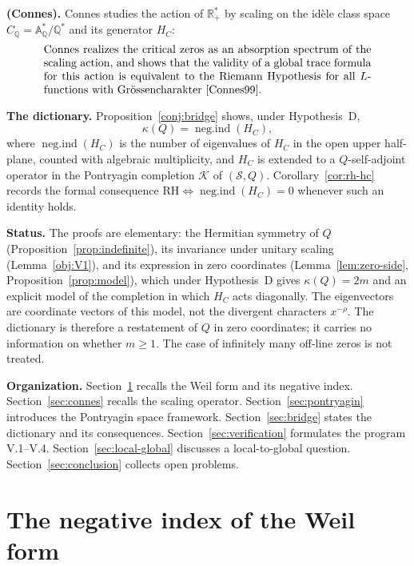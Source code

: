 \documentclass[11pt]{amsart}
\newcommand{\kap}{\kappa}
\newcommand{\negind}{\operatorname{neg.ind}}
\newcommand{\AQ}{\mathbb{A}_{\mathbb{Q}}}
\newcommand{\CQ}{C_{\mathbb{Q}}}
\newcommand{\Kcal}{\mathcal{K}}
\newcommand{\Scal}{\mathcal{S}}
\newcommand{\Rp}{\mathbb{R}^*_+}
\begin{document}
\medskip
\textbf{(Connes).}  Connes \cite{Connes99} studies the action of $\Rp$ by scaling on the
id\`ele class space $\CQ = \AQ^*/\mathbb{Q}^*$ and its generator $H_C$:
\begin{equation}\label{eq:connes-RH}
\begin{minipage}{0.85\textwidth}
Connes realizes the critical zeros as an absorption spectrum of the scaling action, and shows
that the validity of a global trace formula for this action is equivalent to the Riemann
Hypothesis for all $L$-functions with Gr\"ossencharakter \cite{Connes99}.
\end{minipage}
\end{equation}

\medskip
\textbf{The dictionary.}  Proposition~\ref{conj:bridge} shows, under Hypothesis~D,
\[
  \kap(Q) = \negind(H_C),
\]
where $\negind(H_C)$ is the number of eigenvalues of $H_C$ in the open upper half-plane,
counted with algebraic multiplicity, and $H_C$ is extended to a $Q$-self-adjoint operator in
the Pontryagin completion $\Kcal$ of $(\Scal, Q)$.  Corollary~\ref{cor:rh-hc} records the
formal consequence $\mathrm{RH} \iff \negind(H_C) = 0$ whenever such an identity holds.

\medskip
\textbf{Status.}  The proofs are elementary: the Hermitian symmetry of $Q$
(Proposition~\ref{prop:indefinite}), its invariance under unitary scaling
(Lemma~\ref{obj:V1}), and its expression in zero coordinates
(Lemma~\ref{lem:zero-side}, Proposition~\ref{prop:model}), which under Hypothesis~D gives
$\kap(Q)=2m$ and an explicit model of the completion in which $H_C$ acts diagonally.  The
eigenvectors are coordinate vectors of this model, not the divergent characters $x^{-\rho}$.
The dictionary is therefore a restatement of $Q$ in zero coordinates; it carries no
information on whether $m\ge1$.  The case of infinitely many off-line zeros is not treated.

\medskip
\textbf{Organization.}  Section~\ref{sec:krein} recalls the Weil form and its negative index.
Section~\ref{sec:connes} recalls the scaling operator.  Section~\ref{sec:pontryagin}
introduces the Pontryagin space framework.  Section~\ref{sec:bridge} states the dictionary
and its consequences.  Section~\ref{sec:verification} formulates the program V.1--V.4.
Section~\ref{sec:local-global} discusses a local-to-global question.
Section~\ref{sec:conclusion} collects open problems.

\section{The negative index of the Weil form}
\label{sec:krein}
\end{document}

